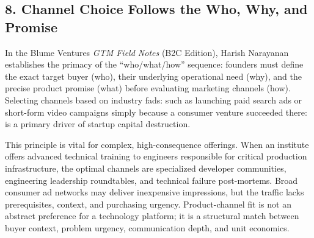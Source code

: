 \subsection*{8. Channel Choice Follows the Who, Why, and Promise}

In the Blume Ventures \textit{GTM Field Notes} (B2C Edition), Harish Narayanan establishes the primacy of the ``who/what/how'' sequence: founders must define the exact target buyer (who), their underlying operational need (why), and the precise product promise (what) before evaluating marketing channels (how). Selecting channels based on industry fads: such as launching paid search ads or short-form video campaigns simply because a consumer venture succeeded there: is a primary driver of startup capital destruction.

This principle is vital for complex, high-consequence offerings. When an institute offers advanced technical training to engineers responsible for critical production infrastructure, the optimal channels are specialized developer communities, engineering leadership roundtables, and technical failure post-mortems. Broad consumer ad networks may deliver inexpensive impressions, but the traffic lacks prerequisites, context, and purchasing urgency. Product-channel fit is not an abstract preference for a technology platform; it is a structural match between buyer context, problem urgency, communication depth, and unit economics.
